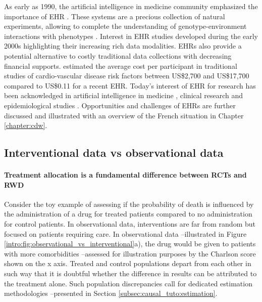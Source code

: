 \documentclass[french,12pt,twoside,a4paper]{book}
\def\sbc{\sffamily\fontseries{sbc}\selectfont}
\def\sbc{\fontseries{sbc}\selectfont}
\def\bsf#1{{\sffamily\sbc\fontsize{14}{11}\selectfont #1}}
\newcommand{\important}[1]{\textcolor{h_color}{\bsf{#1}}}
\begin{document}
\begin{background_box_left}
  As early as 1990, the artificial intelligence in medicine community emphasized
  the importance of EHR \citep{shortliffe1993adolescence}. These systems are a
  precious collection of natural experiments, allowing to complete the
  understanding of genotype-environment interactions with phenotypes
  \citep{butte2006creation,patel2009coming}. Interest in EHR studies developed
  during the early 2000s highlighting their increasing rich data modalities.
  EHRs also provide a potential alternative to costly traditional data
  collections with decreasing financial supports. \cite{casey2016using}
  estimated \important{the average cost per participant in traditional
    studies of cardio-vascular disease risk factors between US\$2,700 and
    US\$17,700 compared to US\$0.11 for a recent EHR.} Today's interest of EHR for
  research has been acknowledged in artificial intelligence in medicine
  \citep{yu2018artificial}, clinical research \citep{cowie2017electronic} and
  epidemiological studies \citep{casey2016using,gianfrancesco2021narrative}.
  Opportunities and challenges of EHRs are further discussed and illustrated
  with an overview of the French situation in Chapter \ref{chapter:cdw}.


  \subsection{Interventional data vs observational data}%
  \label{subsec:intro:interventional_vs_observational}%

  \paragraph{Treatment allocation is a fundamental difference between RCTs and RWD}
  Consider the toy example of assessing if the probability of death is
  influenced by \textcolor{I}{the administration of a drug for treated patients}
  compared to \textcolor{C}{no administration for control patients}. In
  observational data, interventions are far from random but focused on patients
  requiring care. In observational data --illustrated in Figure
  \ref{intro:fig:observational_vs_interventional}a), the drug would be given to
  patients with more comorbidities --assessed for illustration purposes by the
  Charlson score \citep{charlson_new_1987} shown on the x axis. Treated and
  control populations depart from each other in such way that it is doubtful
  whether the difference in results can be attributed to the treatment alone.
  Such population discrepancies call for dedicated estimation methodologies
  --presented in Section \ref{subsec:causal_tuto:estimation}.

\end{background_box_left}
\end{document}

